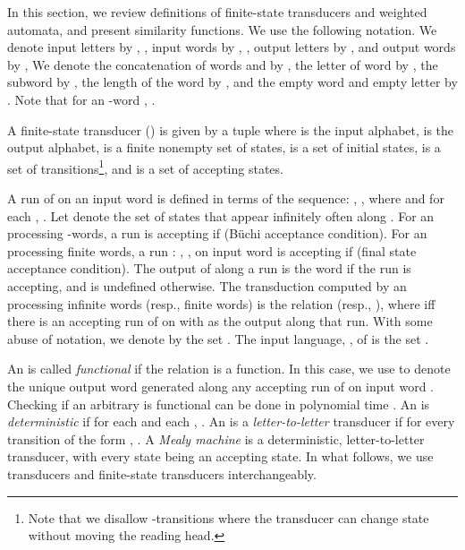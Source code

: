 \newcommand{\alphIi}{{\Lambda}}
\newcommand{\alphOo}{{\Delta}}
\newcommand{\dIi}{d_{\alphIi}}
\newcommand{\dOo}{d_{\alphOo}}
\newcommand{\run}{\gamma}

In this section, we review definitions of finite-state transducers and weighted
automata, and present similarity functions. We use the following notation.  We
denote input letters by ,  \etc, input words by ,  \etc, output
letters by ,  \etc and output words by ,  \etc We denote
the concatenation of words  and  by , the 
letter of word  by , the subword  by , the length of the word  by , and the empty
word and empty letter by . Note that for an -word , .
\medskip 

\label{subsec:fst} A finite-state
transducer (\fst)  is given by a tuple  where
 is the input alphabet,  is the output alphabet,  is a
finite nonempty set of states,  is a set of initial states,  is a set of
transitions\footnote{Note that we disallow -transitions where the
transducer can change state without moving the reading head.}, and  is a 
set of accepting states.

A run  of  on an input word  is defined in
terms of the sequence: , ,  where  and for each , . 
Let  denote the set of states that appear infinitely often along .
For an \fst 
processing -words, a run is accepting if  (B{\"u}chi acceptance condition). 
For an \fst  processing finite words, a run
: ,  ,  on 
input word  is accepting if  (final state acceptance 
condition). 
The output of  along a run is the word 
 if the run is accepting, and is undefined otherwise. The transduction computed
by an \fst  processing infinite words (resp., finite words) 
is the relation  (resp., ), where  iff there is an
accepting run of  on  with  as the output along that run. With
some abuse of notation, we denote by  the set
. The input language,
, of  is the set .

An \fst  is called {\em functional} if the
relation  is a function. In this case, we use
 to denote the unique output word generated  along
any accepting run of  on input word .  Checking if an arbitrary \fst
is functional can be done in polynomial time \cite{gurari_note_1983}. An 
\fst  is {\em deterministic} if for each  and each , 
. An \fst
 is a {\em letter-to-letter} transducer if for every transition of the
form , . A {\em Mealy machine} is 
a deterministic, letter-to-letter transducer, with every state being an accepting state. In what follows, we use transducers and finite-state transducers interchangeably.

